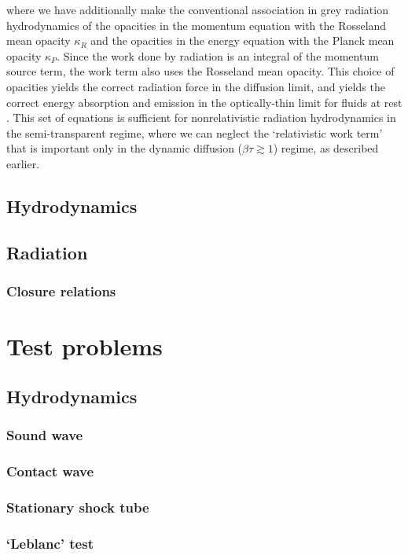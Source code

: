 \documentclass[fleqn,usenatbib]{mnras}
\begin{document}
where we have additionally make the conventional association in grey radiation hydrodynamics of the opacities in the momentum equation with the Rosseland mean opacity $\kappa_R$ and the opacities in the energy equation with the Planck mean opacity $\kappa_P$. Since the work done by radiation is an integral of the momentum source term, the work term also uses the Rosseland mean opacity. This choice of opacities yields the correct radiation force in the diffusion limit, and yields the correct energy absorption and emission in the optically-thin limit for fluids at rest \citep{Mihalas_1984}. This set of equations is sufficient for nonrelativistic radiation hydrodynamics in the semi-transparent regime, where we can neglect the `relativistic work term' that is important only in the dynamic diffusion ($\beta \tau \gtrsim 1$) regime, as described earlier.

\subsection{Hydrodynamics}

\subsection{Radiation}
\subsubsection{Closure relations}

\section{Test problems}
\label{section:tests}

\subsection{Hydrodynamics}
\subsubsection{Sound wave}
\subsubsection{Contact wave}
\subsubsection{Stationary shock tube}
\subsubsection{`Leblanc' test}
\end{document}

